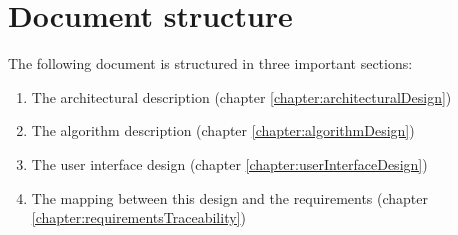 \section{Document structure}
The following document is structured in three important sections:
\begin{enumerate}\addtocounter{enumi}{1}
	\item The architectural description (chapter \ref{chapter:architecturalDesign})
	\item The algorithm description (chapter \ref{chapter:algorithmDesign})
	\item The user interface design (chapter \ref{chapter:userInterfaceDesign})
	\item The mapping between this design and the requirements (chapter \ref{chapter:requirementsTraceability})
\end{enumerate}